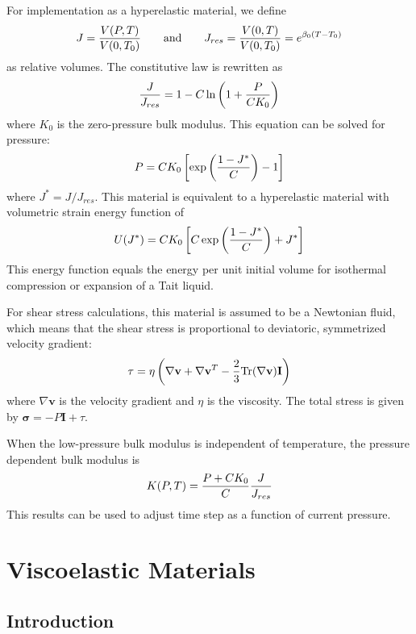 \documentclass[11pt]{book}
\begin{document}
For implementation as a hyperelastic material, we define
\begin{equation}
 J = {V(P,T)\over V(0,T_0)} \qquad {\rm and} \qquad J_{res} = {V(0,T)\over V(0,T_0)} = e^{\beta_0(T-T_0)}
\end{equation}
as relative volumes. The constitutive law is rewritten as
\begin{equation}
     {J\over J_{res}} = 1-C\ln\left(1+{P\over CK_0}\right)
\end{equation}
where $K_0$ is the zero-pressure bulk modulus. This equation can be solved for pressure:
\begin{equation}
    P = CK_0\left[\exp\left(1 - J^*\over C\right)-1\right]
\end{equation}
where $J^*=J/J_{res}$. This material is equivalent to a hyperelastic material with volumetric strain energy function of
\begin{equation}
        U(J^*) = C K_0\left[ C \exp\left({1-J^*\over C}\right) + J^*\right]
\end{equation}
This energy function equals the energy per unit initial volume for isothermal compression or expansion of a Tait liquid.

For shear stress calculations, this material is assumed to be a Newtonian fluid, which means that the shear stress is proportional to deviatoric, symmetrized velocity gradient:
\begin{equation}
    \tau = \eta \left(\nabla \mathbf{v} + \nabla \mathbf{v}^T - {2\over 3}{\rm Tr}(\nabla \mathbf{v})\mathbf{I}\right)
\end{equation}
where $\nabla \mathbf{v}$ is the velocity gradient and $\eta$ is the viscosity. The total stress is given by $ \mathbf{\sigma} = -P \mathbf{I}  + \tau$.

When the low-pressure bulk modulus is independent of temperature, the pressure dependent bulk modulus is
\begin{equation}
       K(P,T) = {P+CK_0\over C} {J\over J_{res}}
\end{equation}
This results can be used to adjust time step as a function of current pressure.

\chapter{Viscoelastic Materials}

\section{Introduction}
\end{document}

